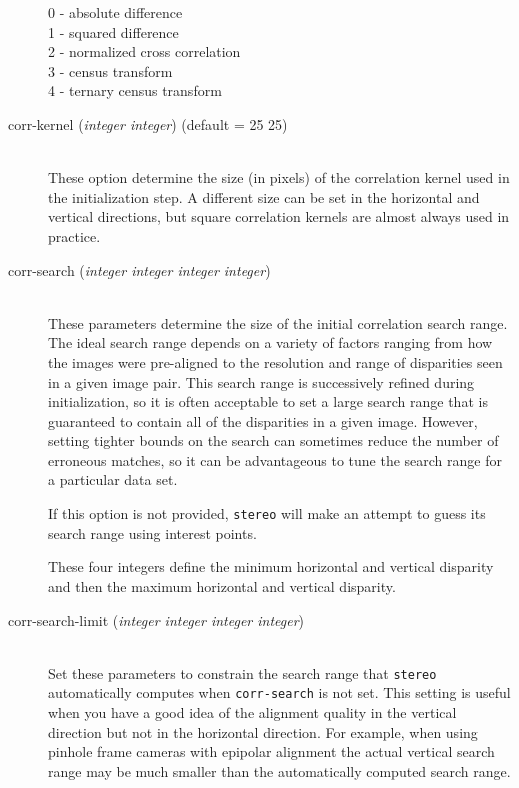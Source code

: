 \begin{description}
  \begin{description}
    \item[0 - absolute difference]
    \item[1 - squared difference]
    \item[2 - normalized cross correlation]
    \item[3 - census transform]
    \item[4 - ternary census transform]
  \end{description}

\item[corr-kernel \textnormal{\small{(\emph{integer integer})}} (default = 25 25)] \hfill \\
  These option determine the size (in pixels) of the correlation
  kernel used in the initialization step.  A different size can be set
  in the horizontal and vertical directions, but square correlation
  kernels are almost always used in practice.

\item[corr-search \textnormal{\small{(\emph{integer integer integer integer})}}] \hfill \\
  These parameters determine the size of the initial correlation
  search range.  The ideal search range depends on a variety of
  factors ranging from how the images were pre-aligned to the
  resolution and range of disparities seen in a given image pair.
  This search range is successively refined during initialization, so
  it is often acceptable to set a large search range that is guaranteed
  to contain all of the disparities in a given image.  However,
  setting tighter bounds on the search can sometimes reduce the number
  of erroneous matches, so it can be advantageous to tune the
  search range for a particular data set.

  If this option is not provided, \texttt{stereo} will make an
  attempt to guess its search range using interest points.

  These four integers define the minimum horizontal and
  vertical disparity and then the maximum horizontal and vertical
  disparity.

\item[corr-search-limit \textnormal{\small{(\emph{integer integer integer integer})}}] \hfill \\
  Set these parameters to constrain the search range that \texttt{stereo}
  automatically computes when \texttt{corr-search} is not set.
  This setting is useful when you have a good idea of the alignment quality
  in the vertical direction but not in the horizontal direction.  For example,
  when using pinhole frame cameras with epipolar alignment the actual vertical
  search range may be much smaller than the automatically computed search range.


\end{description}
